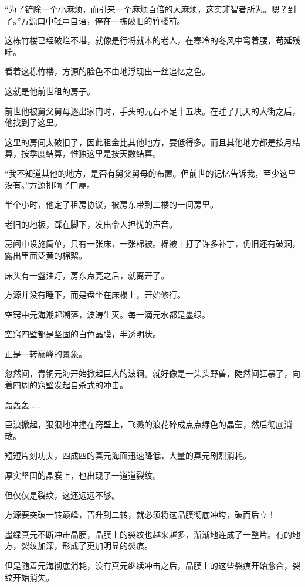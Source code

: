 \begin{this_body}
“为了铲除一个小麻烦，而引来一个麻烦百倍的大麻烦，这实非智者所为。嗯？到了。”方源口中轻声自语，停在一栋破旧的竹楼前。

这栋竹楼已经破烂不堪，就像是行将就木的老人，在寒冷的冬风中弯着腰，苟延残喘。

看着这栋竹楼，方源的脸色不由地浮现出一丝追忆之色。

这就是他前世租的房子。

前世他被舅父舅母逐出家门时，手头的元石不足十五块。在睡了几天的大街之后，他找到了这里。

这里的房间太破旧了，因此租金比其他地方，要低得多。而且其他地方都是按月结算，按季度结算，惟独这里是按天数结算。

“我不知道其他的地方，是否有舅父舅母的布置。但前世的记忆告诉我，至少这里没有。”方源扣响了门扉。

半个小时，他定了租房协议，被房东带到二楼的一间房里。

老旧的地板，踩在脚下，发出令人担忧的声音。

房间中设施简单，只有一张床，一张棉被。棉被上打了许多补丁，仍旧还有破洞，露出里面泛黄的棉絮。

床头有一盏油灯，房东点亮之后，就离开了。

方源并没有睡下，而是盘坐在床榻上，开始修行。

空窍中元海潮起潮落，波涛生灭。每一滴元水都是墨绿。

空窍四壁都是坚固的白色晶膜，半透明状。

正是一转巅峰的景象。

忽然间，青铜元海开始掀起巨大的波澜。就好像是一头头野兽，陡然间狂暴了，向着四周的窍壁发起自杀式的冲击。

轰轰轰……

巨浪掀起，狠狠地冲撞在窍壁上，飞溅的浪花碎成点点绿色的晶莹，然后彻底消散。

短短片刻功夫，四成四的真元海面迅速降低，大量的真元剧烈消耗。

厚实坚固的晶膜上，也出现了一道道裂纹。

但仅仅是裂纹，这还远远不够。

方源要突破一转巅峰，晋升到二转，就必须将这晶膜彻底冲垮，破而后立！

墨绿真元不断冲击晶膜，晶膜上的裂纹也越来越多，渐渐地连成了一整片。有的地方，裂纹加深，形成了更加明显的裂痕。

但是随着元海彻底消耗，没有真元继续冲击之后，晶膜上的这些裂痕开始愈合，裂纹开始消失。


\end{this_body}
